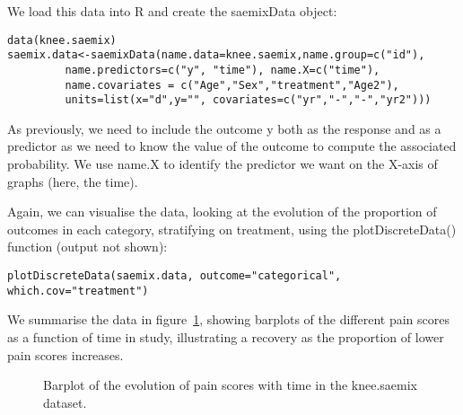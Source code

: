 We load this data into {\sf R} and create the {\sf saemixData} object:
\begin{verbatim}
data(knee.saemix)
saemix.data<-saemixData(name.data=knee.saemix,name.group=c("id"),
         name.predictors=c("y", "time"), name.X=c("time"),
         name.covariates = c("Age","Sex","treatment","Age2"),
         units=list(x="d",y="", covariates=c("yr","-","-","yr2")))
\end{verbatim}
As previously, we need to include the outcome {\sf y} both as the response and as a predictor as we need to know the value of the outcome to compute the associated probability. We use {\sf name.X} to identify the predictor we want on the X-axis of graphs (here, the time).

Again, we can visualise the data, looking at the evolution of the proportion of outcomes in each category, stratifying on treatment, using the {\sf plotDiscreteData()} function (output not shown):
\begin{verbatim}
plotDiscreteData(saemix.data, outcome="categorical", which.cov="treatment")
\end{verbatim}
We summarise the data in figure~\ref{fig:kneeData}, showing barplots of the different pain scores as a function of time in study, illustrating a recovery as the proportion of lower pain scores increases. 
\begin{figure}[!h]
\begin{center}
\end{center}
\par \kern -0.5cm
\caption{Barplot of the evolution of pain scores with time in the {\sf knee.saemix} dataset.} \label{fig:kneeData}
\end{figure}

